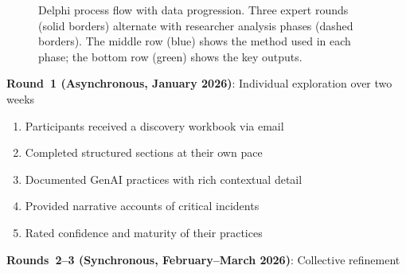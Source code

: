 \begin{figure}[!ht]
    \caption[Delphi process flow with data progression across three rounds.]{Delphi process flow with data progression. Three expert rounds (solid borders) alternate with researcher analysis phases (dashed borders). The middle row (blue) shows the method used in each phase; the bottom row (green) shows the key outputs.}\label{fig:delphi-process}
\end{figure}

\textbf{Round~1 (Asynchronous, January 2026)}: Individual exploration over two weeks

\begin{enumerate}
    \item Participants received a discovery workbook via email
    \item Completed structured sections at their own pace
    \item Documented GenAI practices with rich contextual detail
    \item Provided narrative accounts of critical incidents
    \item Rated confidence and maturity of their practices
\end{enumerate}

\textbf{Rounds~2--3 (Synchronous, February--March 2026)}: Collective refinement

